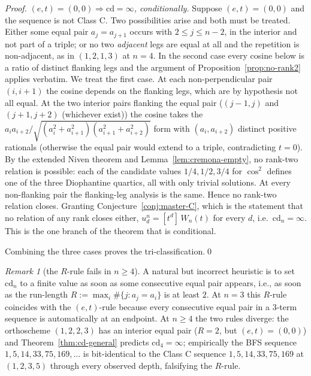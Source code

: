 \documentclass[11pt,a4paper]{article}
\theoremstyle{remark}
\newtheorem{remark}[theorem]{Remark}
\theoremstyle{plain}
\begin{document}
\begin{proof}
\emph{$(e,t) = (0,0) \Rightarrow \mathrm{cd} = \infty$, conditionally.}
Suppose $(e, t) = (0, 0)$ and the sequence is not Class C. Two possibilities
arise and both must be treated. Either some equal pair $a_j = a_{j+1}$ occurs
with $2 \le j \le n-2$, in the interior and not part of a triple; or no two
\emph{adjacent} legs are equal at all and the repetition is non-adjacent, as in
$(1,2,1,3)$ at $n = 4$. In the second case every cosine below is a ratio of
distinct flanking legs and the argument of Proposition~\ref{prop:no-rank2}
applies verbatim. We treat the first case. At each
non-perpendicular pair $(i, i+1)$ the cosine depends on the
flanking legs, which are by hypothesis not all equal.  At the
two interior pairs flanking the equal pair ($(j-1, j)$ and
$(j+1, j+2)$ (whichever exist)) the cosine takes the
$a_i a_{i+2} / \sqrt{(a_i^2 + a_{i+1}^2)(a_{i+1}^2 + a_{i+2}^2)}$
form with $(a_i, a_{i+2})$ distinct positive rationals (otherwise
the equal pair would extend to a triple, contradicting $t = 0$).
By the extended Niven theorem and Lemma~\ref{lem:cremona-empty}, no rank-two
relation is possible: each of the candidate values $1/4, 1/2, 3/4$ for $\cos^2$
defines one of the three Diophantine quartics, all with only trivial solutions.
At every non-flanking pair the flanking-leg analysis is the same. Hence no
rank-two relation closes. Granting Conjecture~\ref{conj:master-C}, which is the
statement that no relation of any rank closes either, $u_d^n = [t^d]\, W_n(t)$
for every $d$, i.e.\ $\mathrm{cd}_n = \infty$. This is the one branch of the
theorem that is conditional.

Combining the three cases proves the tri-classification.\qed
\end{proof}

\begin{remark}[the $R$-rule fails in $n \ge 4$]
\label{rem:R-rule}
A natural but incorrect heuristic is to set $\mathrm{cd}_n$ to a
finite value as soon as some consecutive equal pair appears, i.e.,
as soon as the run-length $R := \max_i \#\{j : a_j = a_i\}$ is at
least $2$.  At $n = 3$ this $R$-rule coincides with the $(e, t)$-rule
because every consecutive equal pair in a $3$-term sequence is
automatically at an endpoint.  At $n \ge 4$ the two rules diverge:
the orthoscheme $(1, 2, 2, 3)$ has an interior equal pair
($R = 2$, but $(e, t) = (0, 0)$) and
Theorem~\ref{thm:cd-general} predicts $\mathrm{cd}_4 = \infty$;
empirically the BFS sequence $1, 5, 14, 33, 75, 169, \ldots$ is
bit-identical to the Class C sequence $1, 5, 14, 33, 75, 169$ at
$(1, 2, 3, 5)$ through every observed depth, falsifying the
$R$-rule.
\end{remark}
\end{document}
